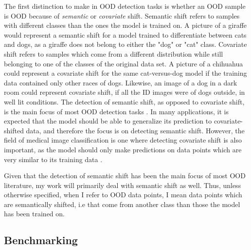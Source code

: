 \documentclass[UKenglish]{uiomasterthesis} %
\theoremstyle{definition}
\begin{document}
The first distinction to make in OOD detection tasks is whether an OOD sample is OOD because of {\it semantic} or {\it covariate} shift. Semantic shift refers to samples with different classes than the ones the model is trained on. A picture of a giraffe would represent a semantic shift for a model trained to differentiate between cats and dogs, as a giraffe does not belong to either the "dog" or "cat" class. Covariate shift refers to samples which come from a different distribution while still belonging to one of the classes of the original data set. A picture of a chihuahua could represent a covariate shift for the same cat-versus-dog model if the training data contained only other races of dogs. Likewise, an image of a dog in a dark room could represent covariate shift, if all the ID images were of dogs outside, in well lit conditions. The detection of semantic shift, as opposed to covariate shift, is the main focus of most OOD detection tasks \cite{oodoverview}. In many applications, it is expected that the model should be able to generalize its prediction to covariate-shifted data, and therefore the focus is on detecting semantic shift. However, the field of medical image classification is one where detecting covariate shift is also important, as the model should only make predictions on data points which are very similar to its training data \cite{oodoverview}.

Given that the detection of semantic shift has been the main focus of most OOD literature, my work will primarily deal with semantic shift as well. Thus, unless otherwise specified, when I refer to OOD data points, I mean data points which are semantically shifted, i.e that come from another class than those the model has been trained on.

\subsection{Benchmarking}
\end{document}
